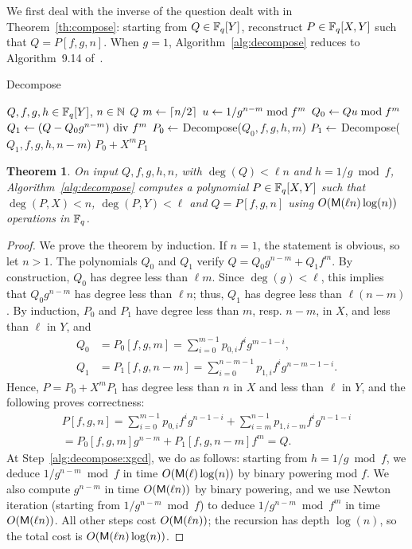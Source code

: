 \documentclass{sig-alternate}
\newtheorem{theorem}[definition]{Theorem}
\begin{document}
We first deal with the inverse of the question dealt with in
Theorem~\ref{th:compose}: starting from $Q \in \mathbb{F}_q[Y]$, reconstruct
$P \in \mathbb{F}_q[X,Y]$ such that $Q=P[f,g,n]$. When $g=1$,
Algorithm~\ref{alg:decompose} reduces to Algorithm~9.14
of~\cite{vzGG}.

\begin{algorithm}[t]
  \caption{Decompose}
  \label{alg:decompose}
  \begin{algorithmic}[1]
    \REQUIRE $Q,f,g,h\in \mathbb{F}_q[Y]$, $n \in \mathbb{N}$ 
    \RETURN $Q$
    \ELSE 
    \STATE $m \leftarrow \lceil n/2 \rceil$ 
    \STATE $u \leftarrow 1/ g^{n-m}\bmod f^m$ \label{alg:decompose:xgcd} 
    \STATE $Q_0 \leftarrow Q u \bmod f^m$ 
    \STATE $Q_1 \leftarrow (Q-Q_0 g^{n-m}) {\rm~div~} f^m$ 
    \STATE $P_0 \leftarrow$ Decompose($Q_0, f, g, h, m$) 
    \STATE $P_1 \leftarrow$ Decompose($Q_1, f, g, h, n-m$) 
    \RETURN $P_0 + X^m P_1$ 
    \ENDIF
  \end{algorithmic}
\end{algorithm}

\begin{theorem}
  On input $Q,f,g,h,n$, with $\deg(Q) < \ell n$ and $h = 1/g \bmod f$,
  Algorithm~\ref{alg:decompose} computes a polynomial $P\in \mathbb{F}_q[X,Y]$
  such that $\deg(P,X)<n$, $\deg(P,Y) <\ell$ and $Q=P[f,g,n]$ using
  $O(\mathsf{M}(\ell n)\log(n))$ operations in $\mathbb{F}_q$.
\end{theorem}
\begin{proof}
  We prove the theorem by induction. If $n=1$, the statement is
  obvious, so let $n> 1$. The polynomials $Q_0$ and $Q_1$ verify $Q =
  Q_0g^{n-m} + Q_1f^m.$ By construction, $Q_0$ has degree less than $\ell
  m$. Since $\deg(g) < \ell$, this implies that $Q_0 g^{n-m}$ has
  degree less than $\ell n$; thus, $Q_1$ has degree less than $\ell
  (n-m)$. By induction, $P_0$ and $P_1$ have degree less than $m$,
  resp. $n-m$, in $X$, and less than  $\ell$ in $Y$, and
  \begin{equation*}
    \begin{aligned}
      Q_0 &= P_0[f,g,m] = \sum_{i=0}^{m-1} p_{0,i}f^ig^{m-1-i},\\
      Q_1 &= P_1[f,g,n-m] = \sum_{i=0}^{n-m-1} p_{1,i}f^ig^{n-m-1-i}.
    \end{aligned}
  \end{equation*}
  Hence, $P=P_0+X^mP_1$ has degree less than $n$ in $X$ and less than $\ell$ 
  in $Y$, and the following proves correctness:
  \begin{multline*}
    P[f,g,n] = \sum_{i=0}^{m-1}p_{0,i}f^ig^{n-1-i} + 
    \sum_{i=m}^{n-1}p_{1,i-m}f^ig^{n-1-i} \\
    =P_0[f,g,m]g^{n-m} + P_1[f,g,n-m]f^m = Q.
  \end{multline*}
  At Step~\ref{alg:decompose:xgcd}, we do as follows: starting from
  $h=1/g \bmod f$, we deduce $1/g^{n-m} \bmod f$ in time
  $O(\mathsf{M}(\ell)\log(n))$ by binary powering mod $f$. We also compute
  $g^{n-m}$ in time $O(\mathsf{M}(\ell n))$ by binary powering, and we use
  Newton iteration (starting from $1/g^{n-m} \bmod f$) to deduce
  $1/g^{n-m} \bmod f^m$ in time $O(\mathsf{M}(\ell n))$. All other steps
  cost $O(\mathsf{M}(\ell n))$; the recursion has depth $\log(n)$,
  so the total cost is $O(\mathsf{M}(\ell n)\log(n))$.
\end{proof}
\end{document}
